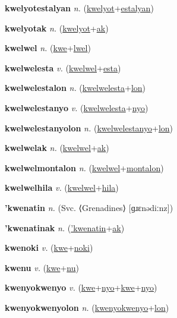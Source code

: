 \textbf{\hypertarget{kwelyotestalyan}{kwelyotestalyan}} \textit{n.} (\hyperlink{kwelyot}{kwelyot}+\allowbreak \hyperlink{estalyan}{estalyan})


\textbf{\hypertarget{kwelyotak}{kwelyotak}} \textit{n.} (\hyperlink{kwelyot}{kwelyot}+\allowbreak \hyperlink{ak}{ak})


\textbf{\hypertarget{kwelwel}{kwelwel}} \textit{n.} (\hyperlink{kwe}{kwe}+\allowbreak \hyperlink{lwel}{lwel})


\textbf{\hypertarget{kwelwelesta}{kwelwelesta}} \textit{v.} (\hyperlink{kwelwel}{kwelwel}+\allowbreak \hyperlink{esta}{esta})


\textbf{\hypertarget{kwelwelestalon}{kwelwelestalon}} \textit{n.} (\hyperlink{kwelwelesta}{kwelwelesta}+\allowbreak \hyperlink{lon}{lon})


\textbf{\hypertarget{kwelwelestanyo}{kwelwelestanyo}} \textit{v.} (\hyperlink{kwelwelesta}{kwelwelesta}+\allowbreak \hyperlink{nyo}{nyo})


\textbf{\hypertarget{kwelwelestanyolon}{kwelwelestanyolon}} \textit{n.} (\hyperlink{kwelwelestanyo}{kwelwelestanyo}+\allowbreak \hyperlink{lon}{lon})


\textbf{\hypertarget{kwelwelak}{kwelwelak}} \textit{n.} (\hyperlink{kwelwel}{kwelwel}+\allowbreak \hyperlink{ak}{ak})


\textbf{\hypertarget{kwelwelmontalon}{kwelwelmontalon}} \textit{n.} (\hyperlink{kwelwel}{kwelwel}+\allowbreak \hyperlink{montalon}{montalon})


\textbf{\hypertarget{kwelwelhila}{kwelwelhila}} \textit{v.} (\hyperlink{kwelwel}{kwelwel}+\allowbreak \hyperlink{hila}{hila})


\textbf{\hypertarget{'kwenatin}{'kwenatin}} \textit{n.} (Svc. ⟨Grenadines⟩ [ɡɹɛnədiːnz])


\textbf{\hypertarget{'kwenatinak}{'kwenatinak}} \textit{n.} (\hyperlink{'kwenatin}{'kwenatin}+\allowbreak \hyperlink{ak}{ak})


\textbf{\hypertarget{kwenoki}{kwenoki}} \textit{v.} (\hyperlink{kwe}{kwe}+\allowbreak \hyperlink{noki}{noki})


\textbf{\hypertarget{kwenu}{kwenu}} \textit{v.} (\hyperlink{kwe}{kwe}+\allowbreak \hyperlink{nu}{nu})


\textbf{\hypertarget{kwenyokwenyo}{kwenyokwenyo}} \textit{v.} (\hyperlink{kwe}{kwe}+\allowbreak \hyperlink{nyo}{nyo}+\allowbreak \hyperlink{kwe}{kwe}+\allowbreak \hyperlink{nyo}{nyo})


\textbf{\hypertarget{kwenyokwenyolon}{kwenyokwenyolon}} \textit{n.} (\hyperlink{kwenyokwenyo}{kwenyokwenyo}+\allowbreak \hyperlink{lon}{lon})


